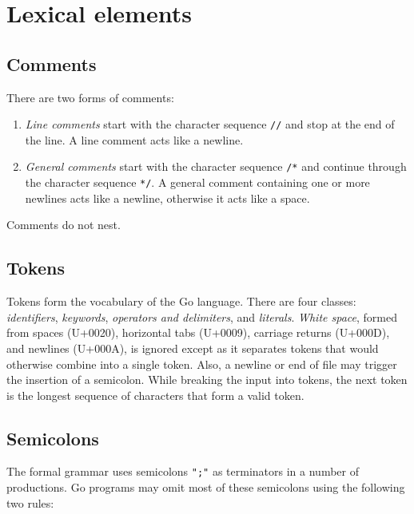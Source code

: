 \section*{Lexical elements}

\subsection*{Comments}

There are two forms of comments:

\begin{enumerate}
\item
  \emph{Line comments} start with the character sequence \texttt{//} and
  stop at the end of the line. A line comment acts like a newline.
\item
  \emph{General comments} start with the character sequence \texttt{/*}
  and continue through the character sequence \texttt{*/}. A general
  comment containing one or more newlines acts like a newline, otherwise
  it acts like a space.
\end{enumerate}

Comments do not nest.

\subsection*{Tokens}

Tokens form the vocabulary of the Go language. There are four classes:
\emph{identifiers}, \emph{keywords}, \emph{operators and delimiters},
and \emph{literals}. \emph{White space}, formed from spaces (U+0020),
horizontal tabs (U+0009), carriage returns (U+000D), and newlines
(U+000A), is ignored except as it separates tokens that would otherwise
combine into a single token. Also, a newline or end of file may trigger
the insertion of a semicolon. While breaking the
input into tokens, the next token is the longest sequence of characters
that form a valid token.

\subsection*{Semicolons}

The formal grammar uses semicolons \texttt{";"} as terminators in a
number of productions. Go programs may omit most of these semicolons
using the following two rules:

